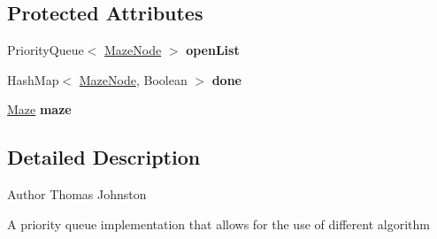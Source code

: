\subsection*{Protected Attributes}
\begin{DoxyCompactItemize}
\item 
\hypertarget{classcs242_1_1johnst26_1_1maze_solver_1_1impl_1_1pqueue_1_1_p_queue_maze_solver_a878c747d202932a231e194cf7ff926a2}{Priority\-Queue$<$ \hyperlink{classcs242_1_1johnst26_1_1maze_solver_1_1impl_1_1pqueue_1_1_maze_node}{Maze\-Node} $>$ {\bfseries open\-List}}\label{classcs242_1_1johnst26_1_1maze_solver_1_1impl_1_1pqueue_1_1_p_queue_maze_solver_a878c747d202932a231e194cf7ff926a2}

\item 
\hypertarget{classcs242_1_1johnst26_1_1maze_solver_1_1impl_1_1pqueue_1_1_p_queue_maze_solver_a9157a641e0149f4e0156ce9cb1c97078}{Hash\-Map$<$ \hyperlink{classcs242_1_1johnst26_1_1maze_solver_1_1impl_1_1pqueue_1_1_maze_node}{Maze\-Node}, Boolean $>$ {\bfseries done}}\label{classcs242_1_1johnst26_1_1maze_solver_1_1impl_1_1pqueue_1_1_p_queue_maze_solver_a9157a641e0149f4e0156ce9cb1c97078}

\item 
\hypertarget{classcs242_1_1johnst26_1_1maze_solver_1_1impl_1_1pqueue_1_1_p_queue_maze_solver_a8f56f17452c0af6b1be85eb2c930e723}{\hyperlink{interfacecs242_1_1johnst26_1_1maze_1_1_maze}{Maze} {\bfseries maze}}\label{classcs242_1_1johnst26_1_1maze_solver_1_1impl_1_1pqueue_1_1_p_queue_maze_solver_a8f56f17452c0af6b1be85eb2c930e723}

\end{DoxyCompactItemize}


\subsection{Detailed Description}
\begin{DoxyAuthor}{Author}
Thomas Johnston
\end{DoxyAuthor}
A priority queue implementation that allows for the use of different algorithm 

